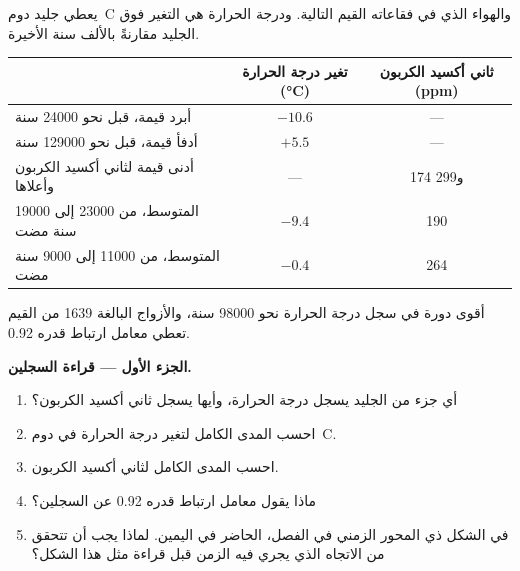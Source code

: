 \begin{problem}
\label{pb:g12:past-climates:1}
يعطي جليد دوم~C والهواء الذي في فقاعاته القيم التالية.
ودرجة الحرارة هي التغير فوق الجليد مقارنةً بالألف سنة الأخيرة.

\begin{center}
\small
\begin{tabular}{|l|c|c|}
\hline
 & \textbf{تغير درجة الحرارة (\unit{\degreeCelsius})} & \textbf{ثاني أكسيد الكربون (ppm)} \\
\hline
أبرد قيمة، قبل نحو \num{24000} سنة & $-10.6$ & --- \\
أدفأ قيمة، قبل نحو \num{129000} سنة & $+5.5$ & --- \\
أدنى قيمة لثاني أكسيد الكربون وأعلاها & --- & 174 و299 \\
المتوسط، من \num{23000} إلى \num{19000} سنة مضت & $-9.4$ & 190 \\
المتوسط، من \num{11000} إلى \num{9000} سنة مضت & $-0.4$ & 264 \\
\hline
\end{tabular}
\end{center}

أقوى دورة في سجل درجة الحرارة نحو \num{98000} سنة،
والأزواج البالغة 1639 من القيم تعطي معامل ارتباط قدره 0.92.

\medskip
\noindent\textbf{الجزء الأول --- قراءة السجلين.}
\begin{enumerate}
  \item أي جزء من الجليد يسجل درجة الحرارة، وأيها يسجل
        ثاني أكسيد الكربون؟
  \item احسب المدى الكامل لتغير درجة الحرارة في دوم~C.
  \item احسب المدى الكامل لثاني أكسيد الكربون.
  \item ماذا يقول معامل ارتباط قدره 0.92 عن
        السجلين؟
  \item في الشكل ذي المحور الزمني في الفصل، الحاضر في اليمين. لماذا
        يجب أن تتحقق من الاتجاه الذي يجري فيه الزمن قبل قراءة مثل هذا الشكل؟
\end{enumerate}


\end{problem}
